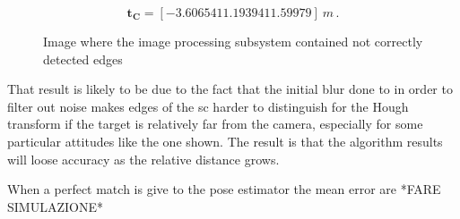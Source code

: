 \begin{equation*}
\mathbf{t_C} = [-3.60654 11.19394 11.59979] \ m \,.
\end{equation*}

\begin{figure}[htbp]
  \centering
  \qquad
  \qquad
  \qquad
  \qquad
  \caption{Image where the image processing subsystem contained not correctly detected edges}
  \label{fig:edgeDetection82}
\end{figure}

That result is likely to be due to the fact that the initial blur done to in order to filter out noise makes edges of the \acrshort{sc} harder to distinguish for the Hough transform if the target is relatively far from the camera, especially for some particular attitudes like the one shown. The result is that the algorithm results will loose accuracy as the relative distance grows.

When a perfect match is give to the pose estimator the mean error are *FARE SIMULAZIONE*
